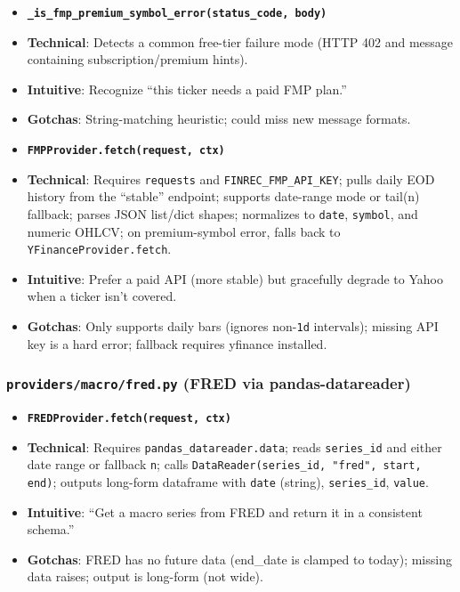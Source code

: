 \documentclass[11pt]{article}
\begin{document}
\begin{itemize}[leftmargin=*,nosep]
\item \textbf{\texttt{\_is\_fmp\_premium\_symbol\_error(status\_code, body)}}
\item \textbf{Technical}: Detects a common free-tier failure mode (HTTP 402 and message containing subscription/premium hints).
\item \textbf{Intuitive}: Recognize “this ticker needs a paid FMP plan.”
\item \textbf{Gotchas}: String-matching heuristic; could miss new message formats.
\item \textbf{\texttt{FMPProvider.fetch(request, ctx)}}
\item \textbf{Technical}: Requires \texttt{requests} and \texttt{FINREC\_FMP\_API\_KEY}; pulls daily EOD history from the “stable” endpoint; supports date-range mode or tail(n) fallback; parses JSON list/dict shapes; normalizes to \texttt{date}, \texttt{symbol}, and numeric OHLCV; on premium-symbol error, falls back to \texttt{YFinanceProvider.fetch}.
\item \textbf{Intuitive}: Prefer a paid API (more stable) but gracefully degrade to Yahoo when a ticker isn’t covered.
\item \textbf{Gotchas}: Only supports daily bars (ignores non-\texttt{1d} intervals); missing API key is a hard error; fallback requires yfinance installed.
\end{itemize}


\subsubsection{\texttt{providers/macro/fred.py} (FRED via pandas-datareader)}

\begin{itemize}[leftmargin=*,nosep]
\item \textbf{\texttt{FREDProvider.fetch(request, ctx)}}
\item \textbf{Technical}: Requires \texttt{pandas\_datareader.data}; reads \texttt{series\_id} and either date range or fallback \texttt{n}; calls \texttt{DataReader(series\_id, "fred", start, end)}; outputs long-form dataframe with \texttt{date} (string), \texttt{series\_id}, \texttt{value}.
\item \textbf{Intuitive}: “Get a macro series from FRED and return it in a consistent schema.”
\item \textbf{Gotchas}: FRED has no future data (end\_date is clamped to today); missing data raises; output is long-form (not wide).
\end{itemize}
\end{document}
